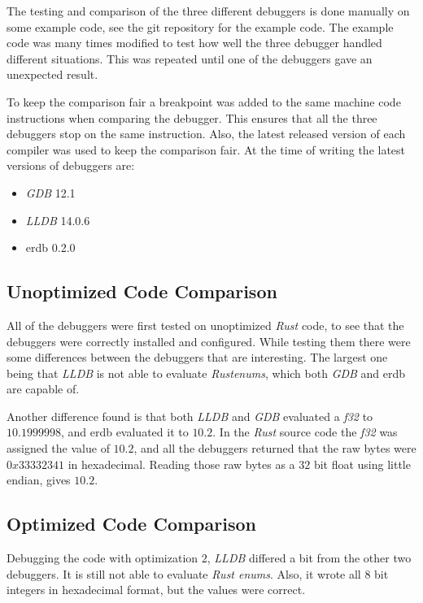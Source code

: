 The testing and comparison of the three different debuggers is done manually on some example code, see the git repository \cite{example-code} for the example code.
The example code was many times modified to test how well the three debugger handled different situations.
This was repeated until one of the debuggers gave an unexpected result.


To keep the comparison fair a breakpoint was added to the same machine code instructions when comparing the debugger.
This ensures that all the three debuggers stop on the same instruction.
Also, the latest released version of each compiler was used to keep the comparison fair.
At the time of writing the latest versions of debuggers are:

\begin{itemize}
    \item \emph{GDB} 12.1
    \item \emph{LLDB} 14.0.6
    \item \gls{erdb} 0.2.0 %
\end{itemize}




\subsection{Unoptimized Code Comparison}
All of the debuggers were first tested on unoptimized \emph{Rust} code, to see that the debuggers were correctly installed and configured.
While testing them there were some differences between the debuggers that are interesting.
The largest one being that \emph{LLDB} is not able to evaluate \emph{Rust}\emph{enums}, which both \emph{GDB} and \gls{erdb} are capable of.


Another difference found is that both \emph{LLDB} and \emph{GDB} evaluated a \emph{f32} to $10.1999998$, and \gls{erdb} evaluated it to $10.2$.
In the \emph{Rust} source code the \emph{f32} was assigned the value of $10.2$, and all the debuggers returned that the raw bytes were $0x33332341$ in hexadecimal.
Reading those raw bytes as a $32$ bit float using little endian, gives $10.2$.



\subsection{Optimized Code Comparison} %
Debugging the code with optimization $2$, \emph{LLDB} differed a bit from the other two debuggers.
It is still not able to evaluate \emph{Rust enums}.
Also, it wrote all $8$ bit integers in hexadecimal format, but the values were correct.


